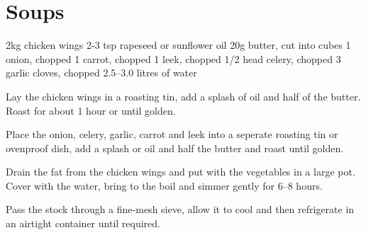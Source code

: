 \chapter{Soups}
\minitoc

\label{rec:schroe-mushroom-soup}
\begin{ingreds}
	2kg chicken wings
     	2-3 tsp rapeseed or sunflower oil
     	20g butter, cut into cubes
     	1 onion, chopped
    	1 carrot, chopped
	1 leek, chopped
	1/2 head celery, chopped
	3 garlic cloves, chopped
	2.5--3.0 litres of water
\end{ingreds}

\begin{method}
     	Lay the chicken wings in a roasting tin, add a splash of oil and half of the butter.  Roast for about 1 hour or until golden.

    	Place the onion, celery, garlic, carrot and leek into a seperate roasting tin or ovenproof dish, add a splash or oil and half the butter and roast until golden.

   	Drain the fat from the chicken wings and put with the vegetables in a large pot.  Cover with the water, bring to the boil and simmer gently for 6--8 hours.

	Pass the stock through a fine-mesh sieve, allow it to cool and then refrigerate in an airtight container until required.
\end {method}